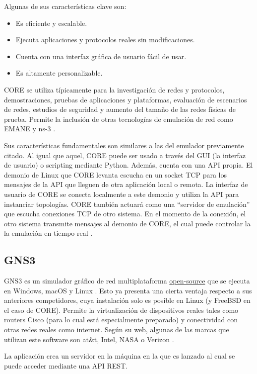 Algunas de sus características clave son:
\begin{itemize}
\item Es eficiente y escalable.
\item Ejecuta aplicaciones y protocolos reales sin modificaciones.
\item Cuenta con una interfaz gráfica de usuario fácil de usar.
\item Es altamente personalizable.
\end{itemize}

CORE se utiliza típicamente para la investigación de redes y protocolos, demostraciones, pruebas de aplicaciones y plataformas, evaluación de escenarios de redes, estudios de seguridad y aumento del tamaño de las redes físicas de prueba. Permite la inclusión de otras tecnologías de emulación de red como EMANE y ns-3 \cite{core}.

Sus características fundamentales son similares a las del emulador previamente citado. Al igual que aquel, CORE puede ser usado a través del GUI (la interfaz de usuario) o scripting mediante Python. Además, cuenta con una API propia. El demonio de Linux que CORE levanta escucha en un socket TCP para los mensajes de la API que lleguen de otra aplicación local o remota. La interfaz de usuario de CORE se conecta localmente a este demonio y utiliza la API para instanciar topologías. CORE también actuará como una ``servidor de emulación'' que escucha conexiones TCP de otro sistema. En el momento de la conexión, el otro sistema transmite mensajes al demonio de CORE, el cual puede controlar la la emulación en tiempo real \cite{coreapi}.

\subsection{GNS3}
GNS3 es un simulador gráfico de red multiplataforma \href{https://github.com/GNS3}{open-source} que se ejecuta en Windows, macOS y Linux \cite{bookgns}. Esto ya presenta una cierta ventaja respecto a sus anteriores competidores, cuya instalación solo es posible en Linux (y FreeBSD en el caso de CORE). Permite la virtualización de dispositivos reales tales como routers Cisco (para lo cual está especialmente preparado) y conectividad con otras redes reales como internet. Según su web, algunas de las marcas que utilizan este software son at\&t, Intel, NASA o Verizon \cite{gnsweb}.

La aplicación crea un servidor en la máquina en la que es lanzado al cual se puede acceder mediante una API REST. 

